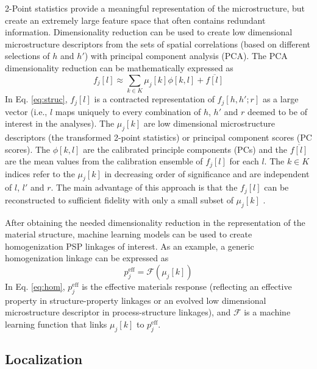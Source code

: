 \documentclass{bmcart}
\begin{document}
2-Point statistics provide a meaningful representation of the
microstructure, but create an extremely large feature space that often
contains redundant information. Dimensionality reduction can be used
to create low dimensional microstructure descriptors from the sets of
spatial correlations (based on different selections of $h$ and $h'$)
with principal component analysis (PCA). The PCA dimensionality
reduction can be mathematically expressed as
\begin{equation} \label{eq:struc}
    f_j\left[l\right] \approx \sum_{k\in K} \mu_j\left[k\right]
    \phi\left[k,l\right] + \overline{f[l]}
\end{equation}
In Eq. \ref{eq:struc}, $f_j\left[l\right]$ is a contracted representation of
$f_j\left[h, h'; r\right]$ %
as a large vector (i.e., $l$ maps uniquely to every combination
of $h$, $h'$ and $r$ deemed to be of interest in the analyses). The $\mu_j[k]$ are low dimensional microstructure
descriptors (the transformed 2-point statistics) or principal component
scores (PC scores). The $\phi\left[k, l\right]$ are the calibrated
principle components (PCs) and the $\overline{f[l]}$ are the mean
values  from the calibration ensemble of $f_j\left[l\right]$ for each
$l$. The $k \in K$ indices refer to the $\mu_j\left[k\right]$ in
decreasing order of significance and are independent of $l$, $l'$ and
$r$. The main advantage of this approach is that the
$f_j\left[l\right]$ can be reconstructed to sufficient fidelity with
only a small subset of $\mu_j\left[k\right]$
\cite{hotelling1933analysis}.

After obtaining the needed dimensionality reduction in the
representation of the material structure, machine learning models can
be used to create homogenization PSP linkages of interest.
As an example, a generic homogenization linkage can be expressed as
\begin{equation} \label{eq:hom}
    p_j^{\text{eff}} = \mathcal{F}(\mu_j[k])
\end{equation}
In Eq. \ref{eq:hom}, $p_j^{\text{eff}}$ is the effective materials
response (reflecting an effective property in structure-property
linkages or an evolved low dimensional microstructure descriptor in
process-structure linkages), and $\mathcal{F}$ is a machine learning
function that links $\mu_j[k]$ to $p_j^{\text{eff}}$.

\subsection{Localization}
\end{document}
